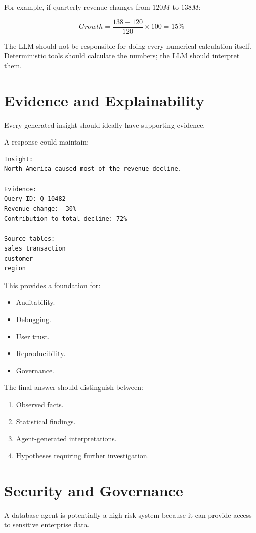 \documentclass[11pt,a4paper]{article}
\begin{document}
For example, if quarterly revenue changes from \(120M\) to \(138M\):

\[
Growth =
\frac{138-120}{120}\times100
=15\%
\]

The LLM should not be responsible for doing every numerical calculation
itself. Deterministic tools should calculate the numbers; the LLM should
interpret them.

\section{Evidence and Explainability}

Every generated insight should ideally have supporting evidence.

A response could maintain:

\begin{lstlisting}
Insight:
North America caused most of the revenue decline.

Evidence:
Query ID: Q-10482
Revenue change: -30%
Contribution to total decline: 72%

Source tables:
sales_transaction
customer
region
\end{lstlisting}

This provides a foundation for:

\begin{itemize}
    \item Auditability.
    \item Debugging.
    \item User trust.
    \item Reproducibility.
    \item Governance.
\end{itemize}

The final answer should distinguish between:

\begin{enumerate}
    \item Observed facts.
    \item Statistical findings.
    \item Agent-generated interpretations.
    \item Hypotheses requiring further investigation.
\end{enumerate}

\section{Security and Governance}

A database agent is potentially a high-risk system because it can provide
access to sensitive enterprise data.
\end{document}
